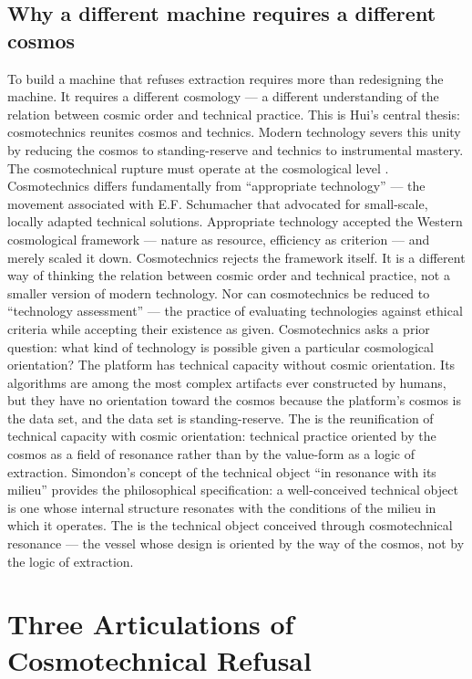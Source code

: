 \subsection{Why a different machine requires a different cosmos}

To build a machine that refuses extraction requires more than redesigning the machine. It requires a different cosmology — a different understanding of the relation between cosmic order and technical practice. This is Hui’s central thesis: cosmotechnics reunites cosmos and technics. Modern technology severs this unity by reducing the cosmos to standing-reserve and technics to instrumental mastery. The cosmotechnical rupture must operate at the cosmological level \cite[pp.~18--45]{hui_2017}. Cosmotechnics differs fundamentally from “appropriate technology” — the movement associated with E.F. Schumacher that advocated for small-scale, locally adapted technical solutions. Appropriate technology accepted the Western cosmological framework — nature as resource, efficiency as criterion — and merely scaled it down. Cosmotechnics rejects the framework itself. It is a different way of thinking the relation between cosmic order and technical practice, not a smaller version of modern technology. Nor can cosmotechnics be reduced to “technology assessment” — the practice of evaluating technologies against ethical criteria while accepting their existence as given. Cosmotechnics asks a prior question: what kind of technology is possible given a particular cosmological orientation? The platform has technical capacity without cosmic orientation. Its algorithms are among the most complex artifacts ever constructed by humans, but they have no orientation toward the cosmos because the platform’s cosmos is the data set, and the data set is standing-reserve. The   is the reunification of technical capacity with cosmic orientation: technical practice oriented by the cosmos as a field of resonance rather than by the value-form as a logic of extraction. Simondon’s concept of the technical object “in resonance with its milieu” provides the philosophical specification: a well-conceived technical object is one whose internal structure resonates with the conditions of the milieu in which it operates. The   is the technical object conceived through cosmotechnical resonance — the vessel whose design is oriented by the way of the cosmos, not by the logic of extraction.

\section{Three Articulations of Cosmotechnical Refusal}

